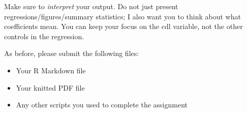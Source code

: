 \documentclass[
]{article}
\providecommand{\tightlist}{%
  \setlength{\itemsep}{0pt}\setlength{\parskip}{0pt}}
\begin{document}
Make sure to \emph{interpret} your output. Do not just present regressions/figures/summary statistics; I also want you to think about what coefficients mean. You can keep your focus on the cdl variable, not the other controls in the regression.

As before, please submit the following files:

\begin{itemize}
\tightlist
\item
  Your R Markdown file
\item
  Your knitted PDF file
\item
  Any other scripts you used to complete the assignment
\end{itemize}
\end{document}
